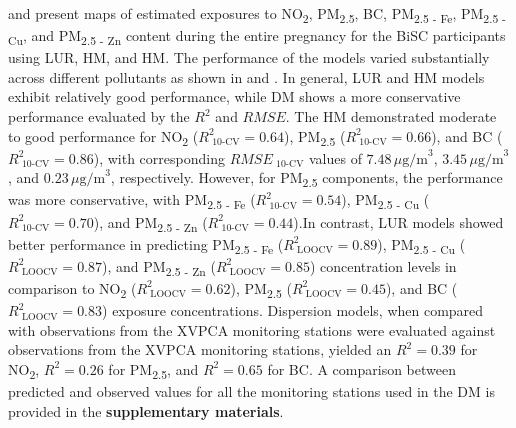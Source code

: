 \documentclass{article}
\begin{document}
 and  present maps of estimated exposures to NO\textsubscript{2}, PM\textsubscript{2.5}, BC, PM\textsubscript{2.5 - Fe}, PM\textsubscript{2.5 - Cu}, and PM\textsubscript{2.5 - Zn} content  during the entire pregnancy for the BiSC participants using LUR, HM, and HM. The performance of the models varied substantially across different pollutants as shown in  and . In general, LUR and HM models exhibit relatively good performance, while DM shows a more conservative performance evaluated by the $R^{2}$ and $RMSE$. The HM demonstrated moderate to good performance for NO\textsubscript{2} ($R^{2}_{\text{ 10-CV}} = 0.64$), PM\textsubscript{2.5} ($R^{2}_{\text{ 10-CV}} = 0.66$), and BC ($R^{2}_{\text{ 10-CV}} = 0.86$), with corresponding $RMSE_{\text{ 10-CV}}$ values of $7.48 \, \mu\text{g/m}^{3}$, $3.45 \, \mu\text{g/m}^{3}$, and $0.23 \, \mu\text{g/m}^{3}$, respectively. However, for PM\textsubscript{2.5} components, the performance was more conservative, with PM\textsubscript{2.5 - Fe} ($R^{2}_{\text{ 10-CV}} = 0.54$), PM\textsubscript{2.5 - Cu} ($R^{2}_{\text{ 10-CV}} = 0.70$), and PM\textsubscript{2.5 - Zn} ($R^{2}_{\text{ 10-CV}} = 0.44$).In contrast, LUR models showed better performance in predicting PM\textsubscript{2.5 - Fe} ($R^{2}_{\text{ LOOCV}} = 0.89$), PM\textsubscript{2.5 - Cu} ($R^{2}_{\text{ LOOCV}} = 0.87$), and PM\textsubscript{2.5 - Zn} ($R^{2}_{\text{ LOOCV}} = 0.85$) concentration levels in comparison to  NO\textsubscript{2} ($R^{2}_{\text{ LOOCV}} = 0.62$), PM\textsubscript{2.5} ($R^{2}_{\text{ LOOCV}} = 0.45$), and BC ($R^{2}_{\text{ LOOCV}} = 0.83$) exposure concentrations. Dispersion models, when compared with observations from the XVPCA monitoring stations were evaluated against observations from the XVPCA monitoring stations, yielded an $R^{2} = 0.39$ for NO\textsubscript{2}, $R^{2} = 0.26$ for PM\textsubscript{2.5}, and $R^{2} = 0.65$ for BC. A comparison between predicted and observed values for all the monitoring stations used in the DM is provided in the \textbf{supplementary materials}. 
\end{document}
